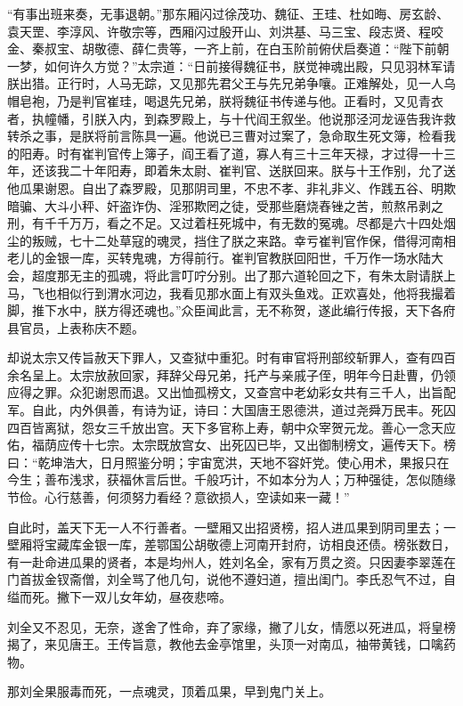 \documentclass[12pt]{lsbook}
\begin{document}
“有事出班来奏，无事退朝。”那东厢闪过徐茂功、魏征、王珪、杜如晦、房玄龄、袁天罡、李淳风、许敬宗等，西厢闪过殷开山、刘洪基、马三宝、段志贤、程咬金、秦叔宝、胡敬德、薛仁贵等，一齐上前，在白玉阶前俯伏启奏道：“陛下前朝一梦，如何许久方觉？”太宗道：“日前接得魏征书，朕觉神魂出殿，只见羽林军请朕出猎。正行时，人马无踪，又见那先君父王与先兄弟争嚷。正难解处，见一人乌帽皂袍，乃是判官崔珪，喝退先兄弟，朕将魏征书传递与他。正看时，又见青衣者，执幢幡，引朕入内，到森罗殿上，与十代阎王叙坐。他说那泾河龙诬告我许救转杀之事，是朕将前言陈具一遍。他说已三曹对过案了，急命取生死文簿，检看我的阳寿。时有崔判官传上簿子，阎王看了道，寡人有三十三年天禄，才过得一十三年，还该我二十年阳寿，即着朱太尉、崔判官、送朕回来。朕与十王作别，允了送他瓜果谢恩。自出了森罗殿，见那阴司里，不忠不孝、非礼非义、作践五谷、明欺暗骗、大斗小秤、奸盗诈伪、淫邪欺罔之徒，受那些磨烧舂锉之苦，煎熬吊剥之刑，有千千万万，看之不足。又过着枉死城中，有无数的冤魂。尽都是六十四处烟尘的叛贼，七十二处草寇的魂灵，挡住了朕之来路。幸亏崔判官作保，借得河南相老儿的金银一库，买转鬼魂，方得前行。崔判官教朕回阳世，千万作一场水陆大会，超度那无主的孤魂，将此言叮咛分别。出了那六道轮回之下，有朱太尉请朕上马，飞也相似行到渭水河边，我看见那水面上有双头鱼戏。正欢喜处，他将我撮着脚，推下水中，朕方得还魂也。”众臣闻此言，无不称贺，遂此编行传报，天下各府县官员，上表称庆不题。

却说太宗又传旨赦天下罪人，又查狱中重犯。时有审官将刑部绞斩罪人，查有四百余名呈上。太宗放赦回家，拜辞父母兄弟，托产与亲戚子侄，明年今日赴曹，仍领应得之罪。众犯谢恩而退。又出恤孤榜文，又查宫中老幼彩女共有三千人，出旨配军。自此，内外俱善，有诗为证，诗曰：大国唐王恩德洪，道过尧舜万民丰。死囚四百皆离狱，怨女三千放出宫。天下多官称上寿，朝中众宰贺元龙。善心一念天应佑，福荫应传十七宗。太宗既放宫女、出死囚已毕，又出御制榜文，遍传天下。榜曰：“乾坤浩大，日月照鉴分明；宇宙宽洪，天地不容奸党。使心用术，果报只在今生；善布浅求，获福休言后世。千般巧计，不如本分为人；万种强徒，怎似随缘节俭。心行慈善，何须努力看经？意欲损人，空读如来一藏！”

自此时，盖天下无一人不行善者。一壁厢又出招贤榜，招人进瓜果到阴司里去；一壁厢将宝藏库金银一库，差鄂国公胡敬德上河南开封府，访相良还债。榜张数日，有一赴命进瓜果的贤者，本是均州人，姓刘名全，家有万贯之资。只因妻李翠莲在门首拔金钗斋僧，刘全骂了他几句，说他不遵妇道，擅出闺门。李氏忍气不过，自缢而死。撇下一双儿女年幼，昼夜悲啼。

刘全又不忍见，无奈，遂舍了性命，弃了家缘，撇了儿女，情愿以死进瓜，将皇榜揭了，来见唐王。王传旨意，教他去金亭馆里，头顶一对南瓜，袖带黄钱，口噙药物。

那刘全果服毒而死，一点魂灵，顶着瓜果，早到鬼门关上。
\end{document}
